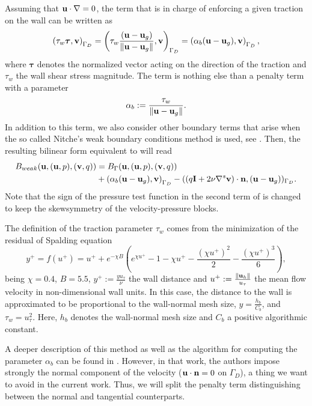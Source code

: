 Assuming that $ {\bf u}\cdot\nabla=0 $, the term that is in charge of enforcing a given traction on the wall can be written as
\begin{equation}
\label{eq-C7_wall_term}
\left(\tau_w\boldsymbol{\tau},{\bf v}\right)_{\Gamma_D}=\left(\tau_w\frac{({\bf u}-{\bf u}_g)}{\|{\bf u}-{\bf u}_g\|},{\bf v}\right)_{\Gamma_D}=\left(\alpha_b({\bf u}-{\bf u}_g),{\bf v}\right)_{\Gamma_D},
\end{equation}
where $ \boldsymbol{\tau} $ denotes the normalized vector acting on the direction of the traction and $ \tau_w $ the wall shear stress magnitude. The term  is nothing else than a penalty term with a parameter \begin{equation}
\label{eq-C7_alpha_b}
\alpha_b:=\frac{\tau_w}{\|{\bf u}-{\bf u}_g\|}.
\end{equation}
In addition to this term, we also consider other boundary terms that arise when the so called Nitche's weak boundary conditions method is used, see \cite{nitsche_uber_1971,stenberg_techniques_1995}. Then, the resulting bilinear form equivalent to  will read
\begin{align}
\label{eq-C7_bilinear_weak}
B_{weak}({\bf u},({\bf u},p),({\bf v},q))&=B_\Gamma({\bf u},({\bf u},p),({\bf v},q))\\\nonumber
&+\left(\alpha_b({\bf u}-{\bf u}_g),{\bf v}\right)_{\Gamma_D}-((q\mathbf{I}+2\nu\nabla^s{\bf v})\cdot{\bf n},({\bf u}-{\bf u}_g))_{\Gamma_D}.
\end{align}
Note that the sign of the pressure test function in the second term of  is changed to keep the skewsymmetry of the velocity-pressure blocks. 

The definition of the traction parameter $ \tau_w $ comes from the minimization of the residual of Spalding equation
\begin{equation}
\label{eq-C7_spalding}
y^+=f(u^+)=u^++e^{-\chi B}\left(e^{\chi u^+}-1-\chi u^+-\frac{\left(\chi u^+\right)^2}{2}-\frac{\left(\chi u^+\right)^3}{6}\right),
\end{equation}
being $ \chi=0.4 $, $ B=5.5 $, $ y^+:=\frac{yu_\tau}{\nu} $ the wall distance and $ u^+:=\frac{\|{\bf u}_h\|}{u_\tau} $ the mean flow velocity in non-dimensional wall units. In this case, the distance to the wall is approximated to be proportional to the wall-normal mesh size, $ y=\frac{h_b}{C_b} $, and $ \tau_w=u_\tau^2 $. Here, $ h_b $ denotes the wall-normal mesh size and $ C_b $ a positive algorithmic constant.

A deeper description of this method as well as the algorithm for computing the parameter $\alpha_b$ can be found in \cite{bazilevs_weak_2007}. However, in that work, the authors impose strongly the normal component of the velocity ($ {\bf u}\cdot{\bf n}=0 $ on $ \Gamma_D $), a thing we want to avoid in the current work. Thus, we will split the penalty term distinguishing between the normal and tangential counterparts. 

